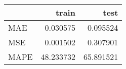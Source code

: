 \begin{tabular}{lrr}
\toprule
{} &      train &       test \\
\midrule
MAE  &   0.030575 &   0.095524 \\
MSE  &   0.001502 &   0.307901 \\
MAPE &  48.233732 &  65.891521 \\
\bottomrule
\end{tabular}
